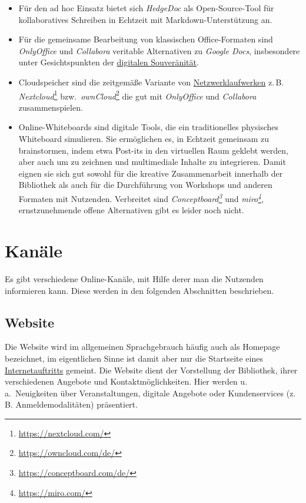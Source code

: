 \documentclass[
  11pt,
  letterpaper,
  DIV=11,
  twoside]{scrreprt}
\DeclareRobustCommand{\href}[2]{#2\footnote{\url{#1}}}
\begin{document}
\begin{itemize}
\item
  Für den ad hoc Einsatz bietet sich \emph{HedgeDoc} als
  Open-Source-Tool für kollaboratives Schreiben in Echtzeit mit
  Markdown-Unterstützung an.
\item
  Für die gemeinsame Bearbeitung von klassischen Office-Formaten sind
  \emph{OnlyOffice} und \emph{Collabora} veritable Alternativen zu
  \emph{Google Docs}, insbesondere unter Gesichtspunkten der
  \hyperref[digitale-souveruxe4nituxe4t]{digitalen Souveränität}.
\item
  Cloudspeicher sind die zeitgemäße Variante von
  \hyperref[fileservices]{Netzwerklaufwerken} z.\,B.
  \href{https://nextcloud.com/}{\emph{Nextcloud}}
  bzw.~\href{https://owncloud.com/de/}{\emph{ownCloud}} die gut mit
  \emph{OnlyOffice} und \emph{Collabora} zusammenspielen.
\item
  Online-Whiteboards sind digitale Tools, die ein traditionelles
  physisches Whiteboard simulieren. Sie ermöglichen es, in Echtzeit
  gemeinsam zu brainstormen, indem etwa Post-its in den virtuellen Raum
  geklebt werden, aber auch um zu zeichnen und multimediale Inhalte zu
  integrieren. Damit eignen sie sich gut sowohl für die kreative
  Zusammenarbeit innerhalb der Bibliothek als auch für die Durchführung
  von Workshops und anderen Formaten mit Nutzenden. Verbreitet sind
  \emph{\href{https://conceptboard.com/de/}{Conceptboard}} und
  \emph{\href{https://miro.com/}{miro}}, ernstzunehmende offene
  Alternativen gibt es leider noch nicht.
\end{itemize}

\section{Kanäle}\label{kanuxe4le}

Es gibt verschiedene Online-Kanäle, mit Hilfe derer man die Nutzenden
informieren kann. Diese werden in den folgenden Abschnitten beschrieben.

\subsection{Website}\label{website-1}

Die Website wird im allgemeinen Sprachgebrauch häufig auch als Homepage
bezeichnet, im eigentlichen Sinne ist damit aber nur die Startseite
eines \hyperref[Website]{Internetauftritts} gemeint. Die Website dient
der Vorstellung der Bibliothek, ihrer verschiedenen Angebote und
Kontaktmöglichkeiten. Hier werden u.\,a.~Neuigkeiten über
Veranstaltungen, digitale Angebote oder Kundenservices (z.\,B.
Anmeldemodalitäten) präsentiert.
\end{document}
